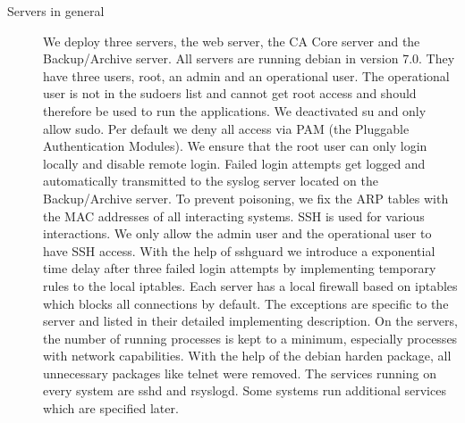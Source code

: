 \documentclass[a4paper, toc=index, 12pt, DIV14, twoside, BCOR2cm, headsepline, numbers=noenddot, bibliography=totoc]{scrbook}
\begin{document}
\begin{description}
\item[Servers in general ] We deploy three servers, the web server, the CA Core server and the Backup/Archive server. All servers are running debian in version 7.0. They have three users, root, an admin and an operational user. The operational user is not in the sudoers list and cannot get root access and should therefore be used to run the applications. We deactivated su and only allow sudo. Per default we deny all access via PAM (the Pluggable Authentication Modules). We ensure that the root user can only login locally and disable remote login. Failed login attempts get logged and automatically transmitted to the syslog server located on the Backup/Archive server. To prevent poisoning, we fix the ARP tables with the MAC addresses of all interacting systems. \newline
SSH is used for various interactions. We only allow the admin user and the operational user to have SSH access. With the help of sshguard we introduce a exponential time delay after three failed login attempts by implementing temporary rules to the local iptables. \newline
Each server has a local firewall based on iptables which blocks all connections by default. The exceptions are specific to the server and listed in their detailed implementing description.\newline
On the servers, the number of running processes is kept to a minimum, especially processes with network capabilities. With the help of the debian harden package, all unnecessary packages like telnet were removed. The services running on every system are sshd and rsyslogd. Some systems run additional services which are specified later. 


\end{description}
\end{document}
